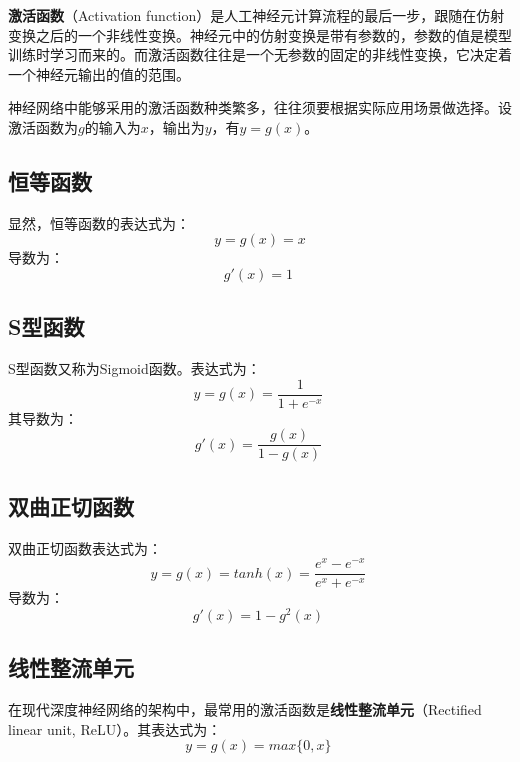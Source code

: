 
\textbf{激活函数}（Activation function）是人工神经元计算流程的最后一步，跟随在仿射变换之后的一个非线性变换。神经元中的仿射变换是带有参数的，参数的值是模型训练时学习而来的。而激活函数往往是一个无参数的固定的非线性变换，它决定着一个神经元输出的值的范围。

神经网络中能够采用的激活函数种类繁多，往往须要根据实际应用场景做选择。设激活函数为$g$的输入为$x$，输出为$y$，有$y=g(x)$。


\subsection{恒等函数}
显然，恒等函数的表达式为：
\begin{equation}
y=g(x)=x
\end{equation}
导数为：
\begin{equation}
g'(x)=1~
\end{equation}

\subsection{S型函数}
S型函数又称为Sigmoid函数。表达式为：
\begin{equation}
y=g(x)=\frac{1}{1+e^{-x}}~
\end{equation}
其导数为：
\begin{equation}
g'(x)=\frac{g(x)}{1-g(x)}~
\end{equation}

\subsection{双曲正切函数}
双曲正切函数表达式为：
\begin{equation}
y=g(x)=tanh(x)=\frac{e^x-e^{-x}}{e^x+e^{-x}}~
\end{equation}
导数为：
\begin{equation}
g'(x)=1-g^2(x)~
\end{equation}

\subsection{线性整流单元}
在现代深度神经网络的架构中，最常用的激活函数是\textbf{线性整流单元}（Rectified linear unit, ReLU）。其表达式为：
\begin{equation}
y=g(x)=max\{0,x\}~
\end{equation}